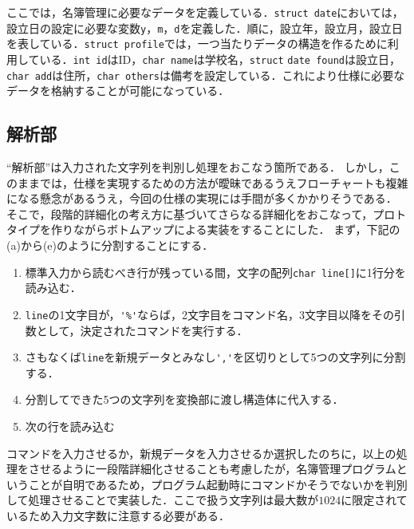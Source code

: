 \documentclass[a4j,11pt]{jarticle}
\begin{document}
ここでは，名簿管理に必要なデータを定義している．\verb|struct date|においては，設立日の設定に必要な変数\verb|y|，\verb|m|，\verb|d|を定義した．順に，設立年，設立月，設立日を表している．\verb|struct profile|では，一つ当たりデータの構造を作るために利用している．\verb|int id|はID，\verb|char name|は学校名，\verb|struct| \verb|date found|は設立日，\verb|char add|は住所，\verb|char others|は備考を設定している．これにより仕様に必要なデータを格納することが可能になっている．

\subsection{解析部} \label{sec:parse}

``解析部''は入力された文字列を判別し処理をおこなう箇所である．
しかし，このままでは，仕様を実現するための方法が曖昧であるうえフローチャートも複雑になる懸念があるうえ，今回の仕様の実現には手間が多くかかりそうである．
そこで，段階的詳細化の考え方に基づいてさらなる詳細化をおこなって，プロトタイプを作りながらボトムアップによる実装をすることにした．
まず，下記の(a)から(e)のように分割することにする．

\begin{enumerate}
\setlength{\parskip}{2pt} \setlength{\itemsep}{2pt}
\renewcommand{\labelenumi}{(\alph{enumi})} %
    \item 標準入力から読むべき行が残っている間，文字の配列\verb|char line[]|に1行分を読み込む．
    \item \verb|line|の1文字目が，\verb|'%'|ならば，2文字目をコマンド名，3文字目以降をその引数として，決定されたコマンドを実行する．
    \item さもなくば\verb|line|を新規データとみなし\verb|','|を区切りとして5つの文字列に分割する．
    \item 分割してできた5つの文字列を変換部に渡し構造体に代入する．
    \item 次の行を読み込む
\end{enumerate}
コマンドを入力させるか，新規データを入力させるか選択したのちに，以上の処理をさせるように一段階詳細化させることも考慮したが，名簿管理プログラムということが自明であるため，プログラム起動時にコマンドかそうでないかを判別して処理させることで実装した．ここで扱う文字列は最大数が$1024$に限定されているため入力文字数に注意する必要がある．

\end{document}
